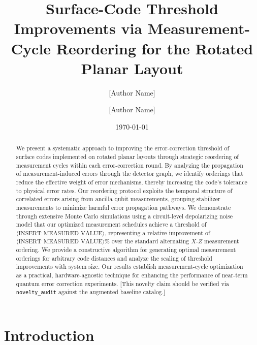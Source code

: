 \documentclass[
    reprint,
    aps,
    prx,
    superscriptaddress,
    longbibliography
]{revtex4-2}
\begin{document}
\title{Surface-Code Threshold Improvements via Measurement-Cycle Reordering for the Rotated Planar Layout}

\author{[Author Name]}
\affiliation{[Institution], [Address]}

\author{[Author Name]}
\affiliation{[Institution], [Address]}

\date{\today}

\begin{abstract}
We present a systematic approach to improving the error-correction threshold of surface codes implemented on rotated planar layouts through strategic reordering of measurement cycles within each error-correction round. By analyzing the propagation of measurement-induced errors through the detector graph, we identify orderings that reduce the effective weight of error mechanisms, thereby increasing the code's tolerance to physical error rates. Our reordering protocol exploits the temporal structure of correlated errors arising from ancilla qubit measurements, grouping stabilizer measurements to minimize harmful error propagation pathways. We demonstrate through extensive Monte Carlo simulations using a circuit-level depolarizing noise model that our optimized measurement schedules achieve a threshold of $\langle\text{INSERT MEASURED VALUE}\rangle$, representing a relative improvement of $\langle\text{INSERT MEASURED VALUE}\rangle$\% over the standard alternating $X$-$Z$ measurement ordering. We provide a constructive algorithm for generating optimal measurement orderings for arbitrary code distances and analyze the scaling of threshold improvements with system size. Our results establish measurement-cycle optimization as a practical, hardware-agnostic technique for enhancing the performance of near-term quantum error correction experiments. [This novelty claim should be verified via \texttt{novelty\_audit} against the augmented baseline catalog.]
\end{abstract}

\maketitle

\section{Introduction}
\label{sec:introduction}
\end{document}
